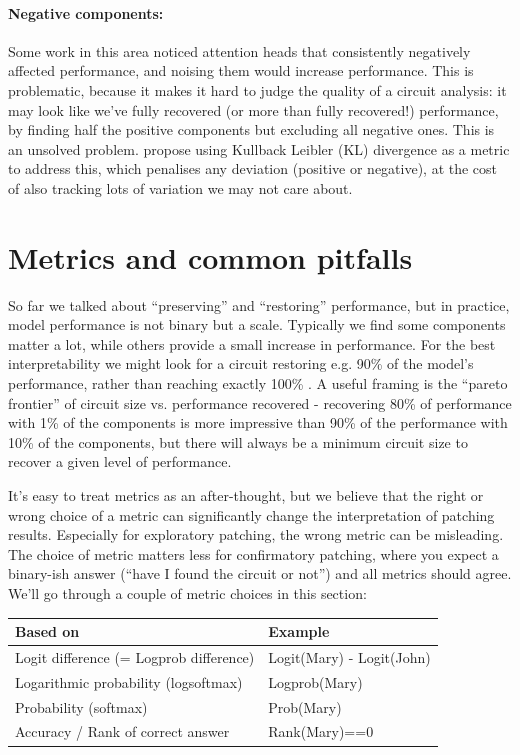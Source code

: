 \documentclass[nonatbib]{article}
\begin{document}
\paragraph{Negative components:} Some work in this area \citep[e.g.][]{IOI,docstrings} noticed attention heads that consistently negatively affected performance, and noising them would increase performance. This is problematic, because it makes it hard to judge the quality of a circuit analysis: it may look like we’ve fully recovered (or more than fully recovered!) performance, by finding half the positive components but excluding all negative ones. This is an unsolved problem. \citet{ACDC} propose using Kullback Leibler (KL) divergence as a metric to address this, which penalises any deviation (positive or negative), at the cost of also tracking lots of variation we may not care about.

\section{Metrics and common pitfalls}
\label{sec3}
So far we talked about “preserving” and “restoring” performance, but in practice, model performance is not binary but a scale. Typically we find some components matter a lot, while others provide a small increase in performance. For the best interpretability we might look for a circuit restoring e.g. 90\% of the model’s performance, rather than reaching exactly 100\% \citep[for examples see][]{causal_scrubbing}. A useful framing is the “pareto frontier” of circuit size vs. performance recovered - recovering 80\% of performance with 1\% of the components is more impressive than 90\% of the performance with 10\% of the components, but there will always be a minimum circuit size to recover a given level of performance.

It’s easy to treat metrics as an after-thought, but we believe that the right or wrong choice of a metric can significantly change the interpretation of patching results. Especially for exploratory patching, the wrong metric can be misleading. The choice of metric matters less for confirmatory patching, where you expect a binary-ish answer (“have I found the circuit or not”) and all metrics should agree. We’ll go through a couple of metric choices in this section:

\begin{table}[h!]
  \begin{tabular}{ll}
    \toprule
    Based on &
    Example \\
    \midrule
    Logit difference (= Logprob difference) & Logit(Mary) - Logit(John) \\
    Logarithmic probability (logsoftmax) & Logprob(Mary) \\
    Probability (softmax) & Prob(Mary) \\
    Accuracy / Rank of correct answer & Rank(Mary)==0 \\
    \bottomrule
  \end{tabular}
\end{table}
\end{document}
